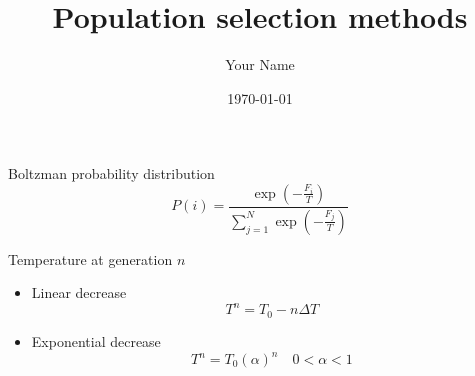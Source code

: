 \documentclass{article}
\begin{document}
\title{Population selection methods}
\author{Your Name}
\date{\today}
\maketitle

Boltzman probability distribution
\[
    P(i) = \frac{ \exp\left(-\frac{F_i}{T}\right)}{\sum_{j=1}^N \exp\left(-\frac{F_j}{T}\right)}
\]  

Temperature at generation $n$ 
\begin{itemize}
    \item Linear decrease
        \[
            T^n = T_0 - n\Delta T
        \]
    \item Exponential decrease 
        \[
            T^n = T_0(\alpha)^n \quad 0<\alpha<1 
        \]
\end{itemize}
\end{document}
